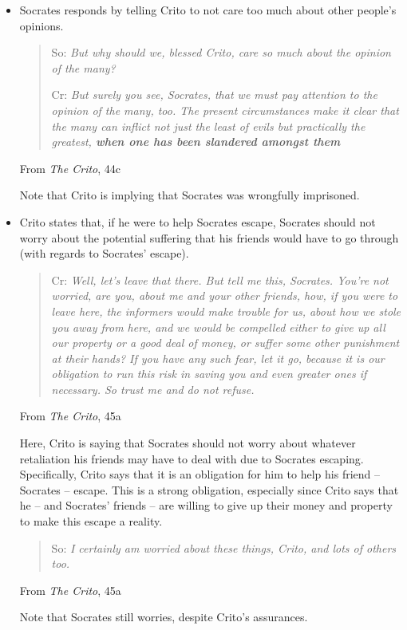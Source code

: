 \documentclass[letterpaper]{article}
\begin{document}
\begin{itemize}
    \item Socrates responds by telling Crito to not care too much about other people's opinions. 
    \begin{mdframed}[]
        \begin{quotation}
            So: \emph{But why should we, blessed Crito, care so much about the opinion of the many?}

            Cr: \emph{But surely you see, Socrates, that we must pay attention to the opinion of the many, too. The present circumstances make it clear that the many can inflict not just the least of evils but practically the greatest, \textbf{when one has been slandered amongst them}}
        \end{quotation}
        From \emph{The Crito}, 44c
    \end{mdframed}
    Note that Crito is implying that Socrates was wrongfully imprisoned. 

    \item Crito states that, if he were to help Socrates escape, Socrates should not worry about the potential suffering that his friends would have to go through (with regards to Socrates' escape).
    \begin{mdframed}[]
        \begin{quotation}
            Cr: \emph{Well, let's leave that there. But tell me this, Socrates. You're not worried, are you, about me and your other friends, how, if you were to leave here, the informers would make trouble for us, about how we stole you away from here, and we would be compelled either to give up all our property or a good deal of money, or suffer some other punishment at their hands? If you have any such fear, let it go, because it is our obligation to run this risk in saving you and even greater ones if necessary. So trust me and do not refuse.}
        \end{quotation}
        From \emph{The Crito}, 45a
    \end{mdframed}
    Here, Crito is saying that Socrates should not worry about whatever retaliation his friends may have to deal with due to Socrates escaping. Specifically, Crito says that it is an obligation for him to help his friend -- Socrates -- escape. This is a strong obligation, especially since Crito says that he -- and Socrates' friends -- are willing to give up their money and property to make this escape a reality. 

    \begin{mdframed}[]
        \begin{quotation}
            So: \emph{I certainly am worried about these things, Crito, and lots of others too.}
        \end{quotation}
        From \emph{The Crito}, 45a
    \end{mdframed}
    Note that Socrates still worries, despite Crito's assurances.


\end{itemize}
\end{document}
